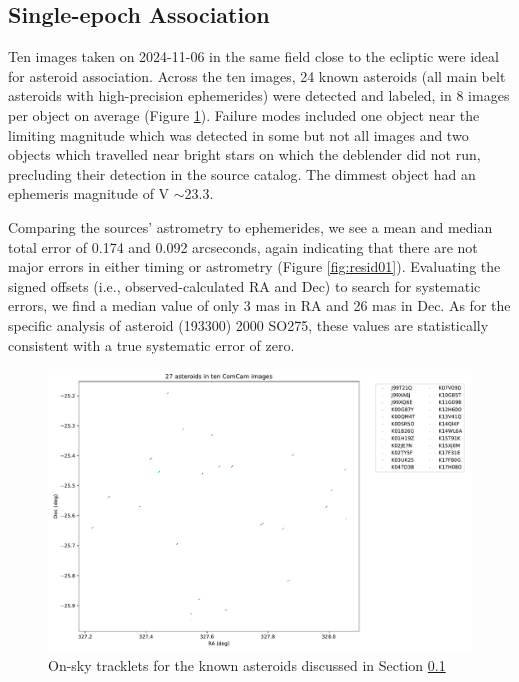 \subsection{Single-epoch Association}
\label{sec:association}

Ten images taken on 2024-11-06 in the same field close to the ecliptic were ideal for asteroid association. Across the ten images, 24 known asteroids (all main belt asteroids with high-precision ephemerides) were detected and labeled, in 8 images per object on average (Figure \ref{fig:asteroids01}). Failure modes included one object near the limiting magnitude which was detected in some but not all images and two objects which travelled near bright stars on which the deblender did not run, precluding their detection in the source catalog. The dimmest object had an ephemeris magnitude of V $\sim$23.3. 

Comparing the sources' astrometry to ephemerides,  we see a mean and median total error of 0.174 and 0.092 arcseconds, again indicating that there are not major errors in either timing or astrometry (Figure \ref{fig:resid01}). Evaluating the signed offsets (i.e., observed-calculated RA and Dec) to search for systematic errors, we find a median value of only 3 mas in RA and 26 mas in Dec. As for the specific analysis of asteroid (193300) 2000 SO275, these values are statistically consistent with a true systematic error of zero.


\begin{figure}
\includegraphics[width=5.5in]{27_asteroids-1.pdf}
\caption{On-sky tracklets for the known asteroids discussed in Section \ref{sec:association} \label{fig:asteroids01}}
\end{figure}

